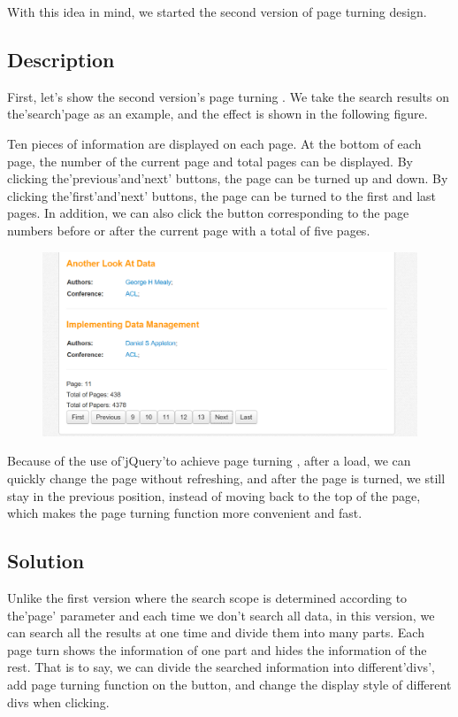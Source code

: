 \documentclass{book}
\begin{document}
With this idea in mind, we started the second version of page turning design.

\subsection{Description}
First, let's show the second version's page turning . We take the search results on the'search'page as an example, and the effect is shown in the following figure.

Ten pieces of information are displayed on each page. At the bottom of each page, the number of the current page and total pages can be displayed. By clicking the'previous'and'next' buttons, the page can be turned up and down. By clicking the'first'and'next' buttons, the page can be turned to the first and last pages. In addition, we can also click the button corresponding to the page numbers before or after the current page with a total of five pages.

\begin{figure}[H]
\centering
\includegraphics[scale=0.25]{img/dsw_1.png}

\end{figure}



Because of the use of'jQuery'to achieve page turning , after a load, we can quickly change the page without refreshing, and after the page is turned, we still stay in the previous position, instead of moving back to the top of the page, which makes the page turning function more convenient and fast.

\subsection{Solution}

Unlike the first version where the search scope is determined according to the'page' parameter and each time we don't search all data, in this version, we can search all the results at one time and divide them into many parts. Each page turn shows the information of one part and hides the information of the rest. That is to say, we can divide the searched information into different'divs', add page turning function on the button, and change the display style of different divs when clicking.
\end{document}
